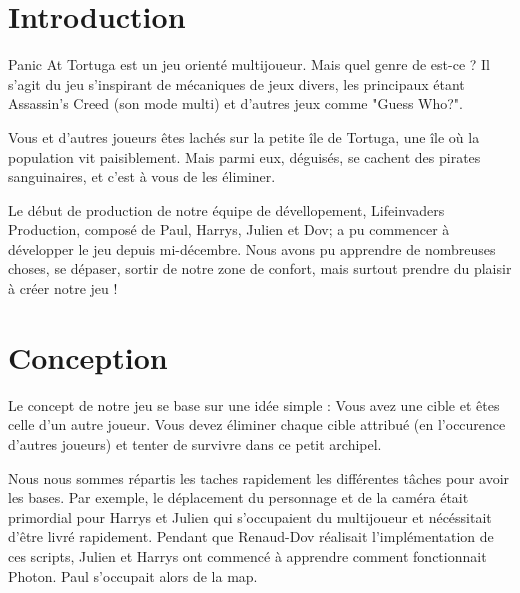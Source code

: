 \documentclass[french, 12pt]{article}
\begin{document}


\tableofcontents
\newpage

\pagestyle{fancy}

\section{Introduction}

Panic At Tortuga est un jeu orienté multijoueur. Mais quel genre de est-ce ?
Il s'agit du jeu s'inspirant de mécaniques de jeux divers, 
les principaux étant Assassin's Creed (son mode multi) et d'autres jeux comme "Guess Who?".

Vous et d'autres joueurs êtes lachés sur la petite île de Tortuga, une île où la population vit paisiblement.
Mais parmi eux, déguisés, se cachent des pirates sanguinaires, et c'est à vous de les éliminer.

Le début de production de notre équipe de dévellopement, Lifeinvaders Production,
composé de Paul, Harrys, Julien et Dov; a pu commencer à développer le jeu depuis mi-décembre.
Nous avons pu apprendre de nombreuses choses, se dépaser, sortir de notre zone de confort, mais surtout prendre du plaisir à créer notre jeu !


\section{Conception}

    Le concept de notre jeu se base sur une idée simple : Vous avez une cible et êtes celle d'un autre joueur.
    Vous devez éliminer chaque cible attribué (en l'occurence d'autres joueurs) et tenter de survivre dans ce petit archipel.

    Nous nous sommes répartis les taches rapidement les différentes tâches pour avoir les bases.
    Par exemple, le déplacement du personnage et de la caméra était primordial pour Harrys et Julien qui s'occupaient du multijoueur et nécéssitait d'être livré rapidement.
    Pendant que Renaud-Dov réalisait l'implémentation de ces scripts, Julien et Harrys ont commencé à apprendre comment fonctionnait Photon. Paul s'occupait alors de la map.
\end{document}

